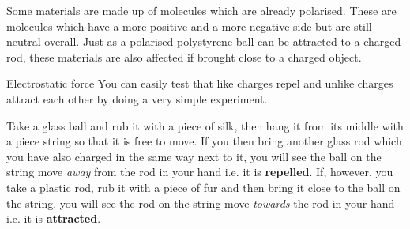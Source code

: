 \label{m38780*id201923}Some materials are made up of molecules which are already polarised.
These are molecules which have
a more positive and a more negative side but are still neutral overall.
Just as a polarised polystyrene ball can be attracted to a charged rod, these materials
are also affected if brought close to a charged object.\par 

\label{m38780*secfhsst!!!underscore!!!id162}
            \begin{Investigation}{Electrostatic force}
            \nopagebreak
      \label{m38780*id200937}You can easily test that
like charges repel and unlike charges attract each other by doing a very
simple experiment.\par 
      \label{m38780*id200944}Take a glass ball and rub it with a piece of silk, then hang it from its middle with a piece string so that it is free to move. If you then bring another glass rod which you
have also charged in the same way next to it, you will see the ball
on the string move \textsl{away} from the rod in your hand i.e.\@{} it
is \textbf{repelled}. If, however, you take a plastic rod, rub it
with a piece of fur and then bring it close to the ball on the
string, you will see the rod on the string move \textsl{towards} the
rod in your hand i.e.\@{} it is \textbf{attracted}.\par 
      \label{m38780*id200971}
    \setcounter{subfigure}{0}

	\begin{figure}[H] %
     \begin{center}
  \end{center}
 \end{figure}       
	\begin{figure}[H] %
     \begin{center}


\end{center}
\end{figure}
\end{Investigation}
